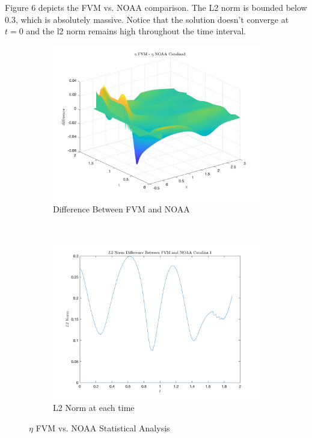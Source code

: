 \documentclass{article}
\begin{document}
Figure 6 depicts the FVM vs. NOAA comparison. The L2 norm is bounded below 0.3, which is absolutely massive. Notice that the solution doesn't converge at $t=0$ and the l2 norm remains high throughout the time interval.


\begin{figure}[t!]
    \centering
    \begin{subfigure}[b]{0.5\textwidth}
        \centering
        \includegraphics[scale=.25]{images/diff_FVM_NOAA_0u.png} 
        \caption{Difference Between FVM and NOAA}
    \end{subfigure}%
    ~ 
    \begin{subfigure}[b]{0.5\textwidth}
        \centering
        \includegraphics[scale=.25]{images/l2_FVM_NOAA_0u.png}
        \caption{L2 Norm at each time}
    \end{subfigure}
    \caption{$\eta$ FVM vs. NOAA Statistical Analysis}
\end{figure}
\end{document}

